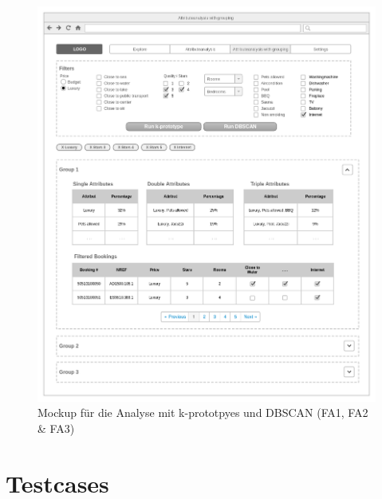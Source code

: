 \begin{figure}[H]
	\RawFloats
	\centering
	\includegraphics[width=1\textwidth]{images/wireframe-clustering}
	\caption{Mockup für die Analyse mit k-prototpyes und DBSCAN (FA1, FA2 \& FA3)}
	\label{fig:konzept:mockups:apriori}
\end{figure}

\section{Testcases}
\label{sec:recherche:testcases}



